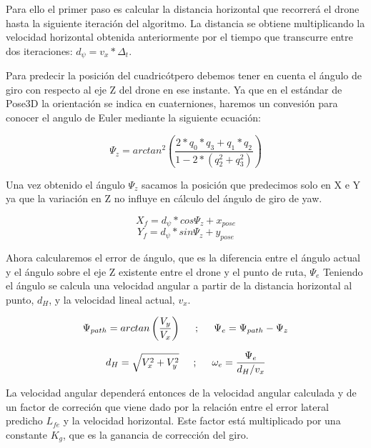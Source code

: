 \hspace{1cm} Para ello el primer paso es calcular la distancia horizontal que recorrerá el drone hasta la siguiente iteración del algoritmo. La distancia se obtiene multiplicando la velocidad horizontal obtenida anteriormente
por el tiempo que transcurre entre dos iteraciones: \(d_{\psi} = v_{x} * \Delta_{t}\).

\hspace{1cm} Para predecir la posición del cuadricótpero debemos tener en cuenta el ángulo de giro con respecto al eje Z del drone en ese instante. Ya que en el estándar de Pose3D la orientación se indica en cuaterniones, haremos un convesión para conocer el angulo de Euler mediante la siguiente ecuación:

\[ \Psi_{z} = arctan^{2}\left( \frac{2*q_{0}*q_{3}+q_{1}*q_{2}}{1-2*(q_{2}^{2}+q_{3}^{2})}\right) \]
 
\hspace{1cm} Una vez obtenido el ángulo $\Psi_{z}$ sacamos la posición que predecimos solo en X e Y ya que la variación en Z no influye en cálculo del ángulo de giro de yaw.

\[ X_{f} = d_{\psi} * cos \Psi_{z} + x_{pose} \] 
\[ Y_{f} = d_{\psi} * sin \Psi_{z} + y_{pose} \]

\hspace{1cm} Ahora calcularemos el error de ángulo, que es la diferencia entre el ángulo actual y el ángulo sobre el eje Z existente entre el drone y el punto de ruta, $\Psi_{e}$ Teniendo el ángulo se calcula una velocidad angular a partir de la distancia horizontal al punto, $d_{H}$, y la velocidad lineal actual, $v_{x}$.
 
\[\Psi_{path} = arctan \left(\frac{V_{y}}{V_{x}}\right)  \hspace{0.5cm};\hspace{0.5cm}\Psi_{e} = \Psi_{path} - \Psi_{z} \]

\[d_{H} = \sqrt{V_{x}^{2} + V_{y}^{2}} \hspace{0.5cm};\hspace{0.5cm} \omega_{e} =  \dfrac{\Psi_{e}}{d_{H}/v_{x}}\]

\hspace{1cm} La velocidad angular dependerá entonces de la velocidad angular calculada y de un factor de correción que viene dado por la relación entre el error lateral predicho $L_{fe}$ y la velocidad horizontal. Este factor está multiplicado por una constante $K_{g}$, que es la ganancia de corrección del giro.


